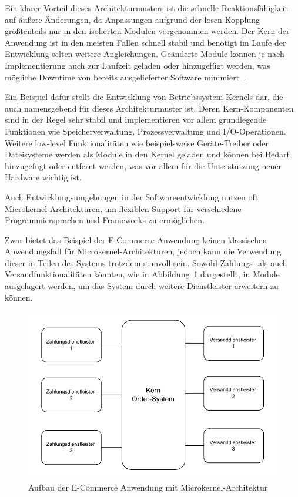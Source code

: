 \documentclass[acmtog]{acmart}
\begin{document}
Ein klarer Vorteil dieses Architekturmusters ist die schnelle Reaktionsfähigkeit auf äußere Änderungen, da Anpassungen aufgrund der losen Kopplung größtenteils nur in den isolierten Modulen vorgenommen werden.
Der Kern der Anwendung ist in den meisten Fällen schnell stabil und benötigt im Laufe der Entwicklung selten weitere Angleichungen.
Geänderte Module können je nach Implementierung auch zur Laufzeit geladen oder hinzugefügt werden, was mögliche Downtime von bereits ausgelieferter Software minimiert~\cite[25]{architecturePatterns}.

Ein Beispiel dafür stellt die Entwicklung von Betriebssystem-Kernels dar, die auch namensgebend für dieses Architekturmuster ist.
Deren Kern-Komponenten sind in der Regel sehr stabil und implementieren vor allem grundlegende Funktionen wie Speicherverwaltung, Prozessverwaltung und I/O-Operationen.
Weitere low-level Funktionalitäten wie beispielsweise Geräte-Treiber oder Dateisysteme werden als Module in den Kernel geladen und können bei Bedarf hinzugefügt oder entfernt werden, was vor allem für die Unterstützung neuer Hardware wichtig ist.

Auch Entwicklungsumgebungen in der Softwareentwicklung nutzen oft Microkernel-Architekturen, um flexiblen Support für verschiedene Programmiersprachen und Frameworks zu ermöglichen.

Zwar bietet das Beispiel der E-Commerce-Anwendung keinen klassischen Anwendungsfall für Microkernel-Architekturen, jedoch kann die Verwendung dieser in Teilen des Systems trotzdem sinnvoll sein.
Sowohl Zahlungs- als auch Versandfunktionalitäten könnten, wie in Abbildung~\ref{fig:ecommerce-microkernel} dargestellt, in Module ausgelagert werden, um das System durch weitere Dienstleister erweitern zu können.

\begin{figure}[!h]
  \centering
  \includegraphics[width=\linewidth]{images/microkernel/ecommerce-microkernel}
  \caption{Aufbau der E-Commerce Anwendung mit Microkernel-Architektur}
  \label{fig:ecommerce-microkernel}
\end{figure}
\end{document}
